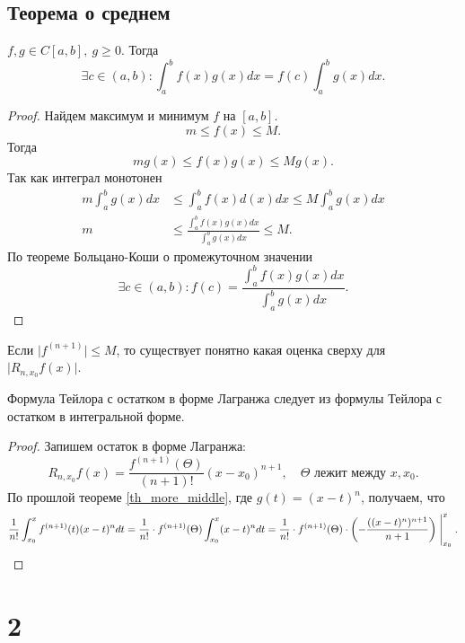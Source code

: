 \subsection{Теорема о среднем}
\begin{thm}\label{th_more_middle}
    $ f, g \in  C[a, b], ~ g \ge 0$. Тогда 
    \[
	\exists c \in (a, b): \int_{a}^{b} f(x) g(x) dx = f(c) \int_{a}^{b} g(x) dx  
    .\] 
\end{thm}
\begin{proof}
    Найдем максимум и минимум $ f$ на $ [a, b]$. \[
	m \le f(x) \le M
    .\] 
    Тогда \[
	m g(x) \le f(x) g(x) \le M g(x)
    .\] 
    Так как интеграл монотонен
    \begin{align*}
	m \int_{a}^{b} g(x) dx & \le  \int_{a}^{b} f(x) d(x) dx \le M \int_{a}^{b} g(x) dx   
	\\
	m &\le  \frac{\int_{a}^{b} f(x)g(x)dx}{\int_{a}^{b} g(x)dx } \le M 
	.
    \end{align*}
    По теореме Больцано-Коши о промежуточном значении 
    \[
	\exists c \in (a, b): f(c) = \frac{\int_{a}^{b} f(x)g(x)dx}{\int_{a}^{b} g(x)dx } 
    .\] 
\end{proof}
\begin{cor}
    Если $ \lvert f^{(n+1)} \rvert \le M$, то существует понятно какая оценка сверху для $ \lvert R_{n, x_0} f(x) \rvert$.
\end{cor}
\begin{thm}
    Формула Тейлора с остатком в форме Лагранжа следует из формулы Тейлора с остатком в интегральной форме.
\end{thm}
\begin{proof}
    Запишем остаток в форме Лагранжа:
    \[
	R_{n, x_0} f(x) = \frac{f^{(n+1)}(\Theta)}{(n+1)!} (x-x_0)^{n+1}, \quad \Theta \text{ лежит между } x, x_0
    .\] 
    По прошлой теореме \ref{th_more_middle}, где $ g(t) = (x-t)^{n}$, получаем, что
    \[
	\frac{1}{n!} \int_{x_0}^{x} f^{(n+1)} (t)(x-t)^{n} dt = \frac{1}{n!} \cdot f^{(n+1)}(\Theta) \int_{x_0}^{x} (x-t)^{n}dt = \frac{1}{n!} \cdot f^{(n+1)}(\Theta) \cdot \left(-\frac{  ((x-t)^{n})^{n+1}}{n+1} \right) \Biggm |_{x_0}^{x}
    .\] 
\end{proof}
\section{2}
% 
